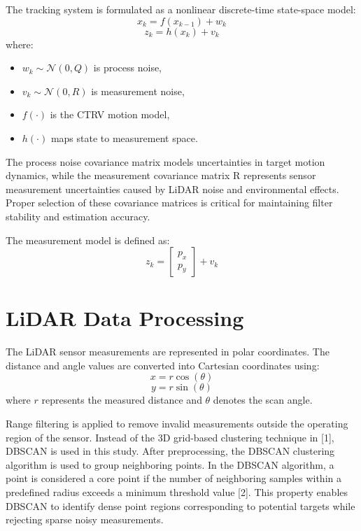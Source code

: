 \documentclass[conference]{IEEEtran}
\begin{document}
The tracking system is formulated as a nonlinear discrete-time state-space model:
\begin{equation}
x_{k}=f(x_{k-1})+w_{k}
\end{equation}
\begin{equation}
z_{k}=h(x_{k})+v_{k}
\end{equation}
where:
\begin{itemize}
    \item $w_{k}\sim\mathcal{N}(0,Q)$ is process noise,
    \item $v_{k}\sim\mathcal{N}(0,R)$ is measurement noise,
    \item $f(\cdot)$ is the CTRV motion model,
    \item $h(\cdot)$ maps state to measurement space.
\end{itemize}

The process noise covariance matrix models uncertainties in target motion dynamics, while the measurement covariance matrix R represents sensor measurement uncertainties caused by LiDAR noise and environmental effects. Proper selection of these covariance matrices is critical for maintaining filter stability and estimation accuracy.

The measurement model is defined as:
\begin{equation}
z_{k}=\begin{bmatrix} p_{x} \\ p_{y} \end{bmatrix}+v_{k}
\end{equation}

\section{LiDAR Data Processing}
The LiDAR sensor measurements are represented in polar coordinates. The distance and angle values are converted into Cartesian coordinates using:
\begin{equation}
x=r \cos(\theta)
\end{equation}
\begin{equation}
y=r \sin(\theta)
\end{equation}
where $r$ represents the measured distance and $\theta$ denotes the scan angle.

Range filtering is applied to remove invalid measurements outside the operating region of the sensor. Instead of the 3D grid-based clustering technique in [1], DBSCAN is used in this study. After preprocessing, the DBSCAN clustering algorithm is used to group neighboring points. In the DBSCAN algorithm, a point is considered a core point if the number of neighboring samples within a predefined radius exceeds a minimum threshold value [2]. This property enables DBSCAN to identify dense point regions corresponding to potential targets while rejecting sparse noisy measurements.
\end{document}
